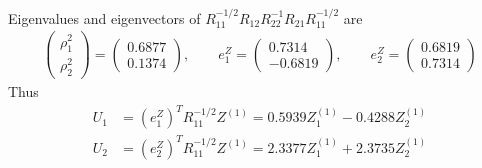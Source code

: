\documentclass[12pt]{extarticle}
\newcommand{\<}{\langle}
\renewcommand{\>}{\rangle}
\theoremstyle{definition}
\begin{document}
\begin{tcolorbox}[enhanced, drop fuzzy shadow, title=Example 10.1 (Cont.)]
Eigenvalues and eigenvectors of $R_{11}^{-1/2}R_{12}R_{22}^{-1}R_{21}R_{11}^{-1/2}$ are
\begin{align*}
    \left(\begin{array}{c}
        \rho_1^2 \\
        \rho_2^2 
        \end{array} \right) = \left(\begin{array}{c}
        0.6877 \\
        0.1374 
        \end{array} \right), \qquad e_1^Z = \left(\begin{array}{c}
        0.7314 \\
        -0.6819 
        \end{array} \right),
        \qquad e_2^Z = \left(\begin{array}{c}
        0.6819 \\
        0.7314 
        \end{array} \right)
\end{align*}
Thus
\begin{align*}
    U_1 &= (e_1^Z)^T R_{11}^{-1/2}Z^{(1)} = 0.5939Z_1^{(1)} - 0.4288Z_2^{(1)}\\
    U_2 &= (e_2^Z)^T R_{11}^{-1/2}Z^{(1)} = 2.3377Z_1^{(1)} + 2.3735Z_2^{(1)}
\end{align*}


\end{tcolorbox}
\end{document}
